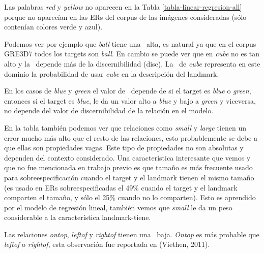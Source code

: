 Las palabras {\it red} y {\it yellow} no aparecen en la Tabla \ref{tabla-linear-regresion-all} porque no aparec\'ian en las ERs del corpus de las im\'agenes consideradas (s\'olo conten\'ian colores verde y azul).

Podemos ver por ejemplo que {\it ball} tiene una \puse\ alta, es natural ya que en el corpus GRE3D7 todos los targets son {\it ball}. En cambio se puede ver que en {\it cube} no es tan alto y la \puse\ depende m\'as de la discernibilidad (disc). La \puse\ de {\it cube} representa en este dominio la probabilidad de usar {\it cube} en la descripci\'on del landmark. 

En los casos de {\it blue} y {\it green} el valor de \puse\ depende de si el target es {\it blue} o {\it green}, entonces si el target es {\it blue}, le da un valor alto a {\it blue} y bajo a {\it green} y viceversa, no depende del valor de discernibilidad de la relaci\'on en el modelo. 

En la tabla tambi\'en podemos ver que relaciones como {\it small} y {\it large} tienen un error mucho m\'as alto que el resto de las relaciones, esto probablemente se debe a que ellas son propiedades vagas. Este tipo de propiedades no son absolutas y dependen del contexto considerado. Una caracter\'istica interesante que vemos y que no fue mencionada en trabajo previo es que tama\~no es m\'as frecuente usado para sobreespecificaci\'on cuando el target y el landmark tienen el mismo tama\~no 
(es usado en ERs sobreespecificadas el 49\% cuando el target y el landmark comparten el tama\~no, y s\'olo el 25\% cuando no lo comparten). Esto es aprendido por el modelo de regresi\'on lineal, tambi\'en vemos que {\it small} le da un peso considerable a la caracter\'istica landmark-tiene.

Las relaciones {\it ontop}, {\it leftof} y {\it rightof} tienen una \puse\ baja. {\it Ontop} es m\'as probable que {\it leftof} o {\it rightof}, esta observaci\'on fue reportada en (Viethen, 2011). 

